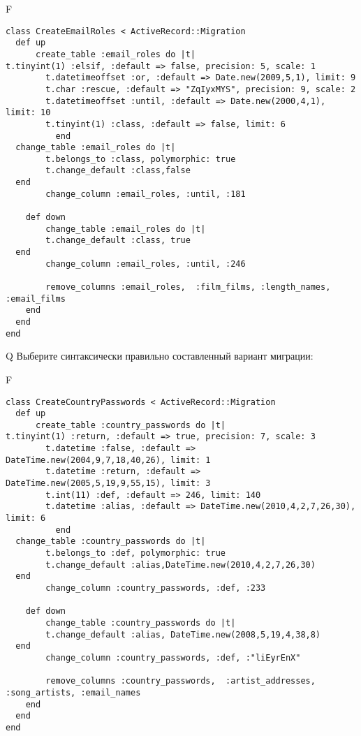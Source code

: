 F
\begin{verbatim}
class CreateEmailRoles < ActiveRecord::Migration
  def up
	  create_table :email_roles do |t|
t.tinyint(1) :elsif, :default => false, precision: 5, scale: 1
		t.datetimeoffset :or, :default => Date.new(2009,5,1), limit: 9
		t.char :rescue, :default => "ZqIyxMYS", precision: 9, scale: 2
		t.datetimeoffset :until, :default => Date.new(2000,4,1), limit: 10
		t.tinyint(1) :class, :default => false, limit: 6
		  end
  change_table :email_roles do |t|
		t.belongs_to :class, polymorphic: true
 		t.change_default :class,false
  end
 		change_column :email_roles, :until, :181
   
	def down
		change_table :email_roles do |t|
		t.change_default :class, true
  end
 		change_column :email_roles, :until, :246
   
		remove_columns :email_roles,  :film_films, :length_names, :email_films 
    end 
  end
end

\end{verbatim}

Q
Выберите синтаксически правильно составленный вариант миграции:

F
\begin{verbatim}
class CreateCountryPasswords < ActiveRecord::Migration
  def up
	  create_table :country_passwords do |t|
t.tinyint(1) :return, :default => true, precision: 7, scale: 3
		t.datetime :false, :default => DateTime.new(2004,9,7,18,40,26), limit: 1
		t.datetime :return, :default => DateTime.new(2005,5,19,9,55,15), limit: 3
		t.int(11) :def, :default => 246, limit: 140
		t.datetime :alias, :default => DateTime.new(2010,4,2,7,26,30), limit: 6
		  end
  change_table :country_passwords do |t|
		t.belongs_to :def, polymorphic: true
 		t.change_default :alias,DateTime.new(2010,4,2,7,26,30)
  end
 		change_column :country_passwords, :def, :233
   
	def down
		change_table :country_passwords do |t|
		t.change_default :alias, DateTime.new(2008,5,19,4,38,8)
  end
 		change_column :country_passwords, :def, :"liEyrEnX"
   
		remove_columns :country_passwords,  :artist_addresses, :song_artists, :email_names 
    end 
  end
end

\end{verbatim}

